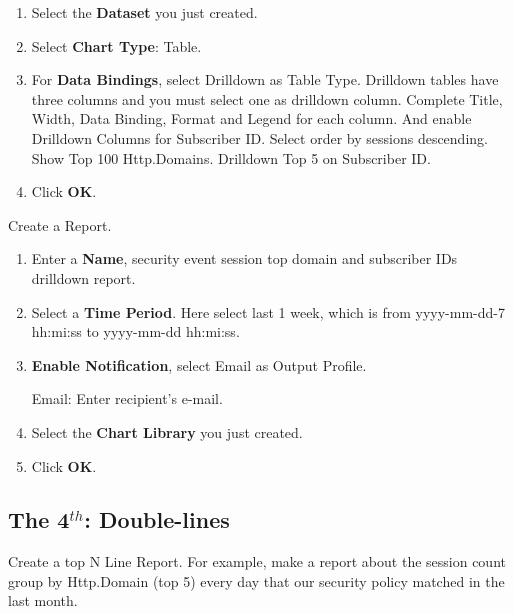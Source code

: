 \begin{description}
\begin{enumerate}
        \item Select the \textbf{Dataset} you just created.
        \item Select \textbf{Chart Type}: Table. 
        \item For \textbf{Data Bindings}, select Drilldown as Table Type. Drilldown tables have three columns and you must select one as drilldown column. Complete Title, Width, Data Binding, Format and Legend for each column. And enable Drilldown Columns for Subscriber ID. Select order by sessions descending. Show Top 100 Http.Domains. Drilldown Top 5 on Subscriber ID.
        \item Click \textbf{OK}.
    \end{enumerate}
    \item[STEP 3.]	Create a Report. 
    \begin{enumerate}
        \item Enter a \textbf{Name}, security event session top domain and subscriber IDs drilldown report.
        \item Select a \textbf{Time Period}. Here select last 1 week, which is from yyyy-mm-dd-7 hh:mi:ss to yyyy-mm-dd hh:mi:ss.
        \item \textbf{Enable Notification}, select Email as Output Profile. 
        

              Email: Enter recipient's e-mail.
        \item Select the \textbf{Chart Library} you just created.
        \item Click \textbf{OK}.
    \end{enumerate}
\end{description}

\subsection*{\hypertarget{link:The 4th: Double-lines}{The 4$^{th}$: Double-lines}}
\label{sec:appendix_f:report:double-lines}

Create a top N Line Report. For example, make a report about the session count group by Http.Domain (top 5) every day that our security policy matched in the last month.


